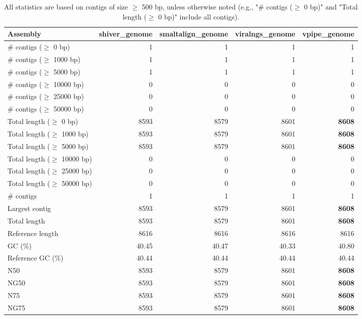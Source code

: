 \documentclass[12pt,a4paper]{article}
\begin{document}
\begin{table}[ht]
\begin{center}
\caption{All statistics are based on contigs of size $\geq$ 500 bp, unless otherwise noted (e.g., "\# contigs ($\geq$ 0 bp)" and "Total length ($\geq$ 0 bp)" include all contigs).}
\begin{tabular}{|l*{4}{|r}|}
\hline
Assembly & shiver\_genome & smaltalign\_genome & viralngs\_genome & vpipe\_genome \\ \hline
\# contigs ($\geq$ 0 bp) & 1 & 1 & 1 & 1 \\ \hline
\# contigs ($\geq$ 1000 bp) & 1 & 1 & 1 & 1 \\ \hline
\# contigs ($\geq$ 5000 bp) & 1 & 1 & 1 & 1 \\ \hline
\# contigs ($\geq$ 10000 bp) & 0 & 0 & 0 & 0 \\ \hline
\# contigs ($\geq$ 25000 bp) & 0 & 0 & 0 & 0 \\ \hline
\# contigs ($\geq$ 50000 bp) & 0 & 0 & 0 & 0 \\ \hline
Total length ($\geq$ 0 bp) & 8593 & 8579 & 8601 & {\bf 8608} \\ \hline
Total length ($\geq$ 1000 bp) & 8593 & 8579 & 8601 & {\bf 8608} \\ \hline
Total length ($\geq$ 5000 bp) & 8593 & 8579 & 8601 & {\bf 8608} \\ \hline
Total length ($\geq$ 10000 bp) & 0 & 0 & 0 & 0 \\ \hline
Total length ($\geq$ 25000 bp) & 0 & 0 & 0 & 0 \\ \hline
Total length ($\geq$ 50000 bp) & 0 & 0 & 0 & 0 \\ \hline
\# contigs & 1 & 1 & 1 & 1 \\ \hline
Largest contig & 8593 & 8579 & 8601 & {\bf 8608} \\ \hline
Total length & 8593 & 8579 & 8601 & {\bf 8608} \\ \hline
Reference length & 8616 & 8616 & 8616 & 8616 \\ \hline
GC (\%) & 40.45 & 40.47 & 40.33 & 40.80 \\ \hline
Reference GC (\%) & 40.44 & 40.44 & 40.44 & 40.44 \\ \hline
N50 & 8593 & 8579 & 8601 & {\bf 8608} \\ \hline
NG50 & 8593 & 8579 & 8601 & {\bf 8608} \\ \hline
N75 & 8593 & 8579 & 8601 & {\bf 8608} \\ \hline
NG75 & 8593 & 8579 & 8601 & {\bf 8608} \\ \hline

\end{tabular}
\end{center}
\end{table}
\end{document}

